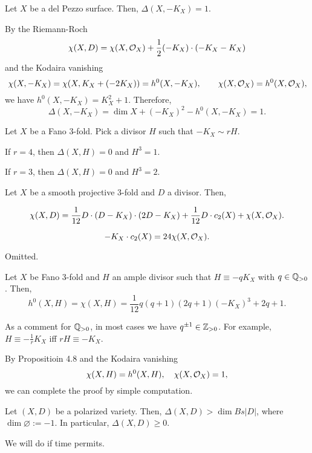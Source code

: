 \documentclass{../../small}
\begin{document}
\begin{ex}
Let $X$ be a del Pezzo surface.
Then, $\Delta(X,-K_X)=1$.
\end{ex}
\begin{pf}
By the Riemann-Roch
\[\chi(X,D)=\chi(X,\mathcal{O}_X)+\frac12(-K_X)\cdot(-K_X-K_X)\]
and the Kodaira vanishing
\[\chi(X,-K_X)=\chi(X,K_X+(-2K_X))=h^0(X,-K_X),\qquad\chi(X,\mathcal{O}_X)=h^0(X,\mathcal{O}_X),\]
we have $h^0(X,-K_X)=K_X^2+1$.
Therefore,
\[\Delta(X,-K_X)=\dim X+(-K_X)^2-h^0(X,-K_X)=1.\]
\end{pf}

\begin{prop}
Let $X$ be a Fano 3-fold.
Pick a divisor $H$ such that $-K_X\sim rH$.
\begin{parts}
\item If $r=4$, then $\Delta(X,H)=0$ and $H^3=1$.
\item If $r=3$, then $\Delta(X,H)=0$ and $H^3=2$.
\end{parts}
\end{prop}
\begin{prop}
Let $X$ be a smooth projective 3-fold and $D$ a divisor.
Then,
\begin{parts}
\item \[\chi(X,D)=\frac1{12}D\cdot(D-K_X)\cdot(2D-K_X)+\frac1{12}D\cdot c_2(X)+\chi(X,\mathcal{O}_X).\]
\item \[-K_X\cdot c_2(X)=24\chi(X,\mathcal{O}_X).\]
\end{parts}
\end{prop}
\begin{pf}
Omitted.
\end{pf}
\begin{cor}
Let $X$ be Fano 3-fold and $H$ an ample divisor such that $H\equiv -qK_X$ with $q\in\mathbb{Q}_{>0}$.
Then,
\[h^0(X,H)=\chi(X,H)=\frac1{12}q(q+1)(2q+1)(-K_X)^3+2q+1.\]
\end{cor}
As a comment for $\mathbb{Q}_{>0}$, in most cases we have $q^{\pm1}\in\mathbb{Z}_{>0}$.
For example, $H\equiv-\frac1rK_X$ iff $rH\equiv-K_X$.
\begin{pf}
By Propositioin 4.8 and the Kodaira vanishing
\[\chi(X,H)=h^0(X,H),\quad\chi(X,\mathcal{O}_X)=1,\]
we can complete the proof by simple computation.
\end{pf}
\begin{thm}
Let $(X,D)$ be a polarized variety.
Then, $\Delta(X,D)>\dim Bs|D|$, where $\dim\varnothing:=-1$.
In particular, $\Delta(X,D)\ge0$.
\end{thm}
\begin{pf}
We will do if time permits.
\end{pf}
\end{document}

